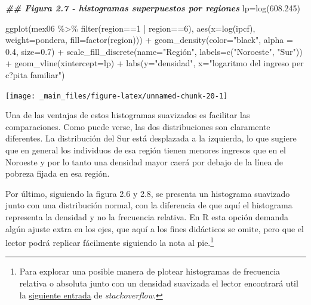 \documentclass[
]{book}
\newenvironment{Shaded}{\begin{snugshade}}{\end{snugshade}}
\newcommand{\AttributeTok}[1]{\textcolor[rgb]{0.77,0.63,0.00}{#1}}
\newcommand{\DecValTok}[1]{\textcolor[rgb]{0.00,0.00,0.81}{#1}}
\newcommand{\DocumentationTok}[1]{\textcolor[rgb]{0.56,0.35,0.01}{\textbf{\textit{#1}}}}
\newcommand{\FloatTok}[1]{\textcolor[rgb]{0.00,0.00,0.81}{#1}}
\newcommand{\FunctionTok}[1]{\textcolor[rgb]{0.00,0.00,0.00}{#1}}
\newcommand{\NormalTok}[1]{#1}
\newcommand{\OtherTok}[1]{\textcolor[rgb]{0.56,0.35,0.01}{#1}}
\newcommand{\SpecialCharTok}[1]{\textcolor[rgb]{0.00,0.00,0.00}{#1}}
\newcommand{\StringTok}[1]{\textcolor[rgb]{0.31,0.60,0.02}{#1}}
\begin{document}
\begin{Shaded}
\begin{Highlighting}[]
\DocumentationTok{\#\# Figura 2.7 {-} histogramas superpuestos por regiones}
\NormalTok{lp}\OtherTok{=}\FunctionTok{log}\NormalTok{(}\FloatTok{608.245}\NormalTok{)}

\FunctionTok{ggplot}\NormalTok{(mex06 }\SpecialCharTok{\%\textgreater{}\%} \FunctionTok{filter}\NormalTok{(region}\SpecialCharTok{==}\DecValTok{1} \SpecialCharTok{|}\NormalTok{ region}\SpecialCharTok{==}\DecValTok{6}\NormalTok{), }
       \FunctionTok{aes}\NormalTok{(}\AttributeTok{x=}\FunctionTok{log}\NormalTok{(ipcf), }\AttributeTok{weight=}\NormalTok{pondera, }\AttributeTok{fill=}\FunctionTok{factor}\NormalTok{(region))) }\SpecialCharTok{+} 
  \FunctionTok{geom\_density}\NormalTok{(}\AttributeTok{color=}\StringTok{"black"}\NormalTok{, }\AttributeTok{alpha =} \FloatTok{0.4}\NormalTok{, }\AttributeTok{size=}\FloatTok{0.7}\NormalTok{) }\SpecialCharTok{+}
  \FunctionTok{scale\_fill\_discrete}\NormalTok{(}\AttributeTok{name=}\StringTok{"Región"}\NormalTok{, }\AttributeTok{labels=}\FunctionTok{c}\NormalTok{(}\StringTok{"Noroeste"}\NormalTok{, }\StringTok{"Sur"}\NormalTok{)) }\SpecialCharTok{+} 
  \FunctionTok{geom\_vline}\NormalTok{(}\AttributeTok{xintercept=}\NormalTok{lp)  }\SpecialCharTok{+}
  \FunctionTok{labs}\NormalTok{(}\AttributeTok{y=}\StringTok{"densidad"}\NormalTok{, }\AttributeTok{x=}\StringTok{"logaritmo del ingreso per c?pita familiar"}\NormalTok{) }
\end{Highlighting}
\end{Shaded}

\texttt{[image: \_main\_files/figure-latex/unnamed-chunk-20-1]}

Una de las ventajas de estos histogramas suavizados es facilitar las comparaciones. Como puede verse, las dos distribuciones son claramente diferentes. La distribución del Sur está desplazada a la izquierda, lo que sugiere que en general los individuos de esa región tienen menores ingresos que en el Noroeste y por lo tanto una densidad mayor caerá por debajo de la línea de pobreza fijada en esa región.

Por último, siguiendo la figura 2.6 y 2.8, se presenta un histograma suavizado junto con una distribución normal, con la diferencia de que aquí el histograma representa la densidad y no la frecuencia relativa. En R esta opción demanda algún ajuste extra en los ejes, que aquí a los fines didácticos se omite, pero que el lector podrá replicar fácilmente siguiendo la nota al pie.\footnote{Para explorar una posible manera de plotear histogramas de frecuencia relativa o absoluta junto con un densidad suavizada el lector encontrará util la \href{https://stackoverflow.com/questions/27611438/density-curve-overlay-on-histogram-where-vertical-axis-is-frequency-aka-count}{siguiente entrada} de \emph{stackoverflow}.}
\end{document}
